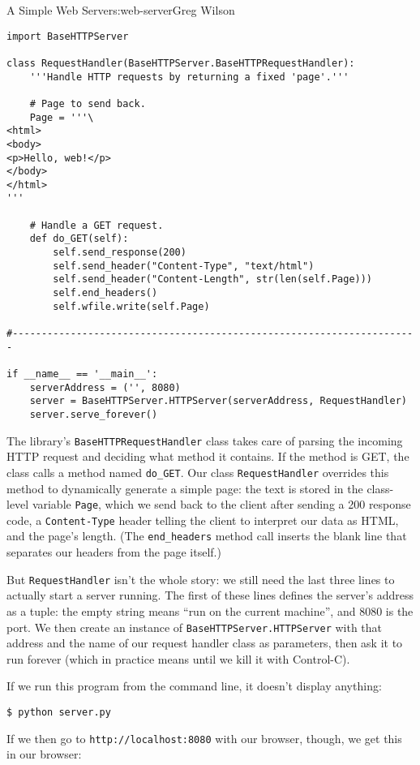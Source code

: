 \begin{aosachapter}{A Simple Web Server}{s:web-server}{Greg Wilson}
\begin{verbatim}
import BaseHTTPServer

class RequestHandler(BaseHTTPServer.BaseHTTPRequestHandler):
    '''Handle HTTP requests by returning a fixed 'page'.'''

    # Page to send back.
    Page = '''\
<html>
<body>
<p>Hello, web!</p>
</body>
</html>
'''

    # Handle a GET request.
    def do_GET(self):
        self.send_response(200)
        self.send_header("Content-Type", "text/html")
        self.send_header("Content-Length", str(len(self.Page)))
        self.end_headers()
        self.wfile.write(self.Page)

#----------------------------------------------------------------------

if __name__ == '__main__':
    serverAddress = ('', 8080)
    server = BaseHTTPServer.HTTPServer(serverAddress, RequestHandler)
    server.serve_forever()
\end{verbatim}

The library's \texttt{BaseHTTPRequestHandler} class takes care of
parsing the incoming HTTP request and deciding what method it contains.
If the method is GET, the class calls a method named \texttt{do\_GET}.
Our class \texttt{RequestHandler} overrides this method to dynamically
generate a simple page: the text is stored in the class-level variable
\texttt{Page}, which we send back to the client after sending a 200
response code, a \texttt{Content-Type} header telling the client to
interpret our data as HTML, and the page's length. (The
\texttt{end\_headers} method call inserts the blank line that separates
our headers from the page itself.)

But \texttt{RequestHandler} isn't the whole story: we still need the
last three lines to actually start a server running. The first of these
lines defines the server's address as a tuple: the empty string means
``run on the current machine'', and 8080 is the port. We then create an
instance of \texttt{BaseHTTPServer.HTTPServer} with that address and the
name of our request handler class as parameters, then ask it to run
forever (which in practice means until we kill it with Control-C).

If we run this program from the command line, it doesn't display
anything:

\begin{verbatim}
$ python server.py
\end{verbatim}

If we then go to \texttt{http://localhost:8080} with our browser,
though, we get this in our browser:


\end{aosachapter}
